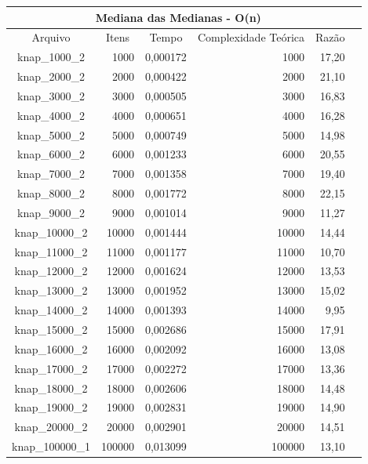 \documentclass[
	12pt,				%
	oneside,			%
	a4paper,			%
	english,			%
	french,				%
	spanish,			%
	brazil,				%
	]{abntex2}
\begin{document}
\begin{longtable}{|c|r|r|r|r|r|}
\toprule
\multicolumn{5}{|c|}{\cellcolor{gray!25}\textbf{Mediana das Medianas - O(n)}}\\
\midrule
\multicolumn{1}{|c|}{\cellcolor{gray!10}Arquivo} & \multicolumn{1}{|c|}{\cellcolor{gray!10}Itens} &  \multicolumn{1}{|c|}{\cellcolor{gray!10}Tempo} &
\multicolumn{1}{|c|}{\cellcolor{gray!10}Complexidade Teórica} &
\multicolumn{1}{|c|}{\cellcolor{gray!10}Razão}\\ \hline
\hline
knap\_1000\_2	&	1000	&	0,000172	&	1000	&	17,20	 \\ \hline
knap\_2000\_2	&	2000	&	0,000422	&	2000	&	21,10	 \\ \hline
knap\_3000\_2	&	3000	&	0,000505	&	3000	&	16,83	 \\ \hline
knap\_4000\_2	&	4000	&	0,000651	&	4000	&	16,28	 \\ \hline
knap\_5000\_2	&	5000	&	0,000749	&	5000	&	14,98	 \\ \hline
knap\_6000\_2	&	6000	&	0,001233	&	6000	&	20,55	 \\ \hline
knap\_7000\_2	&	7000	&	0,001358	&	7000	&	19,40	 \\ \hline
knap\_8000\_2	&	8000	&	0,001772	&	8000	&	22,15	 \\ \hline
knap\_9000\_2	&	9000	&	0,001014	&	9000	&	11,27	 \\ \hline
knap\_10000\_2	&	10000	&	0,001444	&	10000	&	14,44	 \\ \hline
knap\_11000\_2	&	11000	&	0,001177	&	11000	&	10,70	 \\ \hline
knap\_12000\_2	&	12000	&	0,001624	&	12000	&	13,53	 \\ \hline
knap\_13000\_2	&	13000	&	0,001952	&	13000	&	15,02	 \\ \hline
knap\_14000\_2	&	14000	&	0,001393	&	14000	&	9,95	 \\ \hline
knap\_15000\_2	&	15000	&	0,002686	&	15000	&	17,91	 \\ \hline
knap\_16000\_2	&	16000	&	0,002092	&	16000	&	13,08	 \\ \hline
knap\_17000\_2	&	17000	&	0,002272	&	17000	&	13,36	 \\ \hline
knap\_18000\_2	&	18000	&	0,002606	&	18000	&	14,48	 \\ \hline
knap\_19000\_2	&	19000	&	0,002831	&	19000	&	14,90	 \\ \hline
knap\_20000\_2	&	20000	&	0,002901	&	20000	&	14,51	 \\ \hline
knap\_100000\_1	&	100000	&	0,013099	&	100000	&	13,10	 \\ \hline
\end{longtable}
\end{document}

